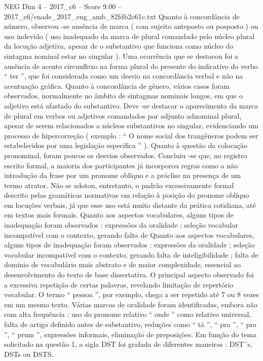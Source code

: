 \begin{textsample}{NEG Dim 4 – 2017\_c6 – Score 9.00 – 2017\_c6/enade\_2017\_eng\_amb\_82fdb2c61c.txt}
Quanto à concordância de número, observou -se ausência de marca ( com sujeito anteposto ou posposto ) ou uso indevido ( uso inadequado da marca de plural comandado pelo núcleo plural da locução adjetiva, apesar de o substantivo que funciona como núcleo do sintagma nominal estar no singular ).
Uma ocorrência que se destacou foi a ausência de acento circunflexo na forma plural do presente do indicativo do verbo “ ter ”, que foi considerada como um desvio na concordância verbal e não na acentuação gráfica.
Quanto à concordância de gênero, vários casos foram observados, normalmente no âmbito de sintagmas nominais longos, em que o adjetivo está afastado do substantivo.
Deve -se destacar o aparecimento da marca de plural em verbos ou adjetivos comandados por adjunto adnominal plural, apesar de serem relacionados a núcleos substantivos no singular, evidenciando um processo de hipercorreção ( exemplo : “ O nome social dos trangêneros podem ser estabelecidos por uma legislação específica ” ).
Quanto à questão da colocação pronominal, foram poucos os desvios observados.
Concluiu -se que, no registro escrito formal, a maioria dos participantes já incorporou regras como a não introdução da frase por um pronome oblíquo e a próclise na presença de um termo atrator.
Não se adotou, entretanto, o padrão excessivamente formal descrito pelas gramáticas normativas em relação à posição do pronome oblíquo em locuções verbais, já que esse uso está muito distante da prática cotidiana, até em textos mais formais.
Quanto aos aspectos vocabulares, alguns tipos de inadequação foram observados : expressões da oralidade ; seleção vocabular incompatível com o contexto, gerando falta de Quanto aos aspectos vocabulares, alguns tipos de inadequação foram observados : expressões da oralidade ; seleção vocabular incompatível com o contexto, gerando falta de inteligibilidade ; falta de domínio de vocabulário mais abstrato e de maior complexidade, essencial ao desenvolvimento do texto de base dissertativa.
O principal aspecto observado foi a excessiva repetição de certas palavras, revelando limitação de repertório vocabular.
O termo “ pessoa ”, por exemplo, chega a ser repetido até 7 ou 8 vezes em um mesmo texto.
Várias marcas de oralidade foram identificadas, embora não com alta frequência : uso do pronome relativo “ onde ” como relativo universal, falta de artigo definido antes de substantivo, reduções como “ tá ”, “ pra ”, “ pro ”, “ prum ”, expressões informais, eliminação de preposições.
Em função do tema solicitado na questão 1, a sigla DST foi grafada de diferentes maneiras : DST´s, DSTs ou DSTS.

\end{textsample}
